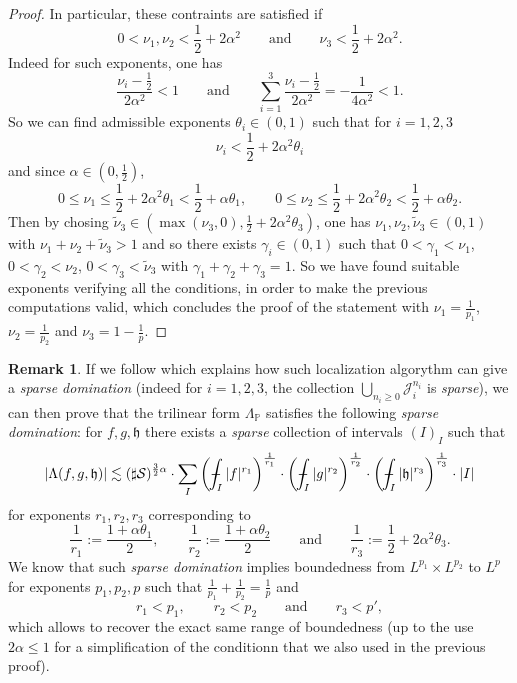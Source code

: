 \documentclass[a4paper,11pt,oneside]{amsart}
\newcommand{\hh}{\mathfrak{h}}
\newcommand{\PP}{\mathbb{P}}
\def\Xint#1{\mathchoice
   {\XXint\displaystyle\textstyle{#1}}%
   {\XXint\textstyle\scriptstyle{#1}}%
   {\XXint\scriptstyle\scriptscriptstyle{#1}}%
   {\XXint\scriptscriptstyle\scriptscriptstyle{#1}}%
   \!\int}
\def\XXint#1#2#3{{\setbox0=\hbox{$#1{#2#3}{\int}$}
     \vcenter{\hbox{$#2#3$}}\kern-.5\wd0}}
\def\aver#1{\Xint-_{#1}}
\def\Xint#1{\mathchoice
   {\XXint\displaystyle\textstyle{#1}}%
   {\XXint\textstyle\scriptstyle{#1}}%
   {\XXint\scriptstyle\scriptscriptstyle{#1}}%
   {\XXint\scriptscriptstyle\scriptscriptstyle{#1}}%
   \!\int}
\def\XXint#1#2#3{{\setbox0=\hbox{$#1{#2#3}{\int}$}
     \vcenter{\hbox{$#2#3$}}\kern-.5\wd0}}
\def\aver#1{\Xint-_{#1}}
\theoremstyle{plain}
\theoremstyle{definition}
\newtheorem{remark}[theorem]{Remark}
\begin{document}
\begin{proof}
In particular, these contraints are satisfied if
$$ 0< \nu_1,\nu_2 < \frac{1}{2}+2\alpha^2 \qquad \textrm{and} \qquad \nu_3 < \frac{1}{2}+2\alpha^2.$$
Indeed for such exponents, one has
$$ \frac{\nu_i-\frac{1}{2}}{2\alpha^2} <1 \qquad \textrm{and}  \qquad \sum_{i=1}^3 \frac{\nu_i-\frac{1}{2}}{2\alpha^2} = -\frac{1}{4\alpha^2} <1.$$
So we can find admissible exponents $\theta_i\in(0,1)$ such that for $i=1,2,3$
$$ \nu_i <\frac{1}{2} +2\alpha^2 \theta_i$$
and since $\alpha\in(0,\frac{1}{2})$, 
$$ 0\leq \nu_1\leq \frac{1}{2}+2\alpha^2 \theta_1< \frac{1}{2}+\alpha \theta_1, \qquad 0\leq \nu_2\leq \frac{1}{2}+2\alpha^2 \theta_2 < \frac{1}{2}+\alpha \theta_2.$$
Then by chosing $\tilde \nu_3 \in (\max(\nu_3,0), \frac{1}{2} +2\alpha^2 \theta_3)$, one has $\nu_1,\nu_2,\tilde \nu_3 \in(0,1)$ with 
$\nu_1+\nu_2+\tilde \nu_3 >1$ and so there exists $\gamma_i\in(0,1)$ such that $0<\gamma_1<\nu_1$, $0<\gamma_2<\nu_2$, $0<\gamma_3<\tilde \nu_3$ with $\gamma_1+\gamma_2+\gamma_3=1$. So we have found suitable exponents verifying all the conditions, in order to make the previous computations valid, which concludes the proof of the statement with $\nu_1=\frac{1}{p_1}$, $\nu_2=\frac{1}{p_2}$ and $\nu_3=1-\frac{1}{p}$.
\end{proof}

\begin{remark} If we follow \cite{BeneaMuscaluSparse} which explains how such localization algorythm can give a {\it sparse domination} (indeed for $i=1,2,3$, the collection $\bigcup_{n_i\geq 0} {\mathcal J}_i^{n_i}$ is {\it sparse}), we can then prove that the trilinear form $\Lambda_{\PP}$ satisfies the following {\it sparse domination}: for $f,g,\hh$ there exists a {\it sparse} collection of intervals $(I)_{I}$ such that
$$ |\Lambda(f,g,\hh)| \lesssim (\sharp {\mathcal S})^{\frac{3}{2} \alpha} \cdot \sum_{I} \left(\aver{I} |f|^{r_1}\right)^{\frac{1}{r_1}} \cdot \left(\aver{I} |g|^{r_2}\right)^{\frac{1}{r_2}} \cdot \left(\aver{I} |\hh|^{r_3}\right)^{\frac{1}{r_3}} \cdot |I| $$
for exponents $r_1,r_2,r_3$ corresponding to
$$ \frac{1}{r_1}:=\frac{1+\alpha \theta_1}{2}, \qquad \frac{1}{r_2}:=\frac{1+\alpha \theta_2}{2} \qquad \textrm{and} \qquad \frac{1}{r_3}:=\frac{1}{2}+2\alpha^2 \theta_3.$$
We know that such {\it sparse domination} implies boundedness from $L^{p_1} \times L^{p_2}$ to $L^{p}$ for exponents $p_1,p_2,p$ such that $\frac{1}{p_1}+\frac{1}{p_2}=\frac{1}{p}$ and
$$ r_1<p_1, \qquad r_2<p_2 \qquad \textrm{and} \qquad r_3< p',$$
which allows to recover the exact same range of boundedness (up to the use $2\alpha\leq 1$ for a simplification of the conditionn that we also used in the previous proof).
\end{remark}
\end{document}
